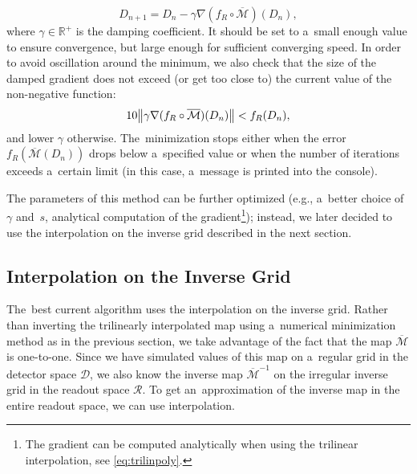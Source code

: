 				\begin{equation}
					D_{n+1} = D_n - \gamma \nabla(f_R\circ\overline{\mathcal{M}})(D_n),
				\end{equation}
			where $\gamma\in\mathbb{R}^+$ is the damping coefficient. It should be set to a~small enough value to ensure convergence, but large enough for sufficient converging speed. In order to avoid oscillation around the minimum, we also check that the size of the damped gradient does not exceed (or get too close to) the current value of the non-negative function:
				\begin{equation}
					10 \norm{\gamma \nabla(f_R\circ\overline{\mathcal{M}})(D_n)} < f_R(D_n),
				\end{equation}
			and lower $\gamma$ otherwise. The~minimization stops either when the error $f_R(\overline{\mathcal{M}}(D_n))$ drops below a~specified value or when the number of iterations exceeds a~certain limit (in this case, a~message is printed into the console).
			
			The parameters of this method can be further optimized (e.g., a~better choice of $\gamma$ and~$s$, analytical computation of the gradient\footnote{The gradient can be computed analytically when using the trilinear interpolation, see \cref{eq:trilinpoly}.}); instead, we later decided to use the interpolation on the inverse grid described in the next section.
			
		
		\subsection{Interpolation on the Inverse Grid}
		\label{sec:interpol}			
			
			The~best current algorithm uses the interpolation on the inverse grid. Rather than inverting the trilinearly interpolated map using a~numerical minimization method as in the previous section, we take advantage of the fact that the map $\overline{\mathcal{M}}$ is one-to-one. Since we have simulated values of this map on a~regular grid in the detector space $\mathcal{D}$, we also know the inverse map $\overline{\mathcal{M}}^{-1}$ on the irregular inverse grid in the readout space $\mathcal{R}$. To get an~approximation of the inverse map in the entire readout space, we can use interpolation.
			
